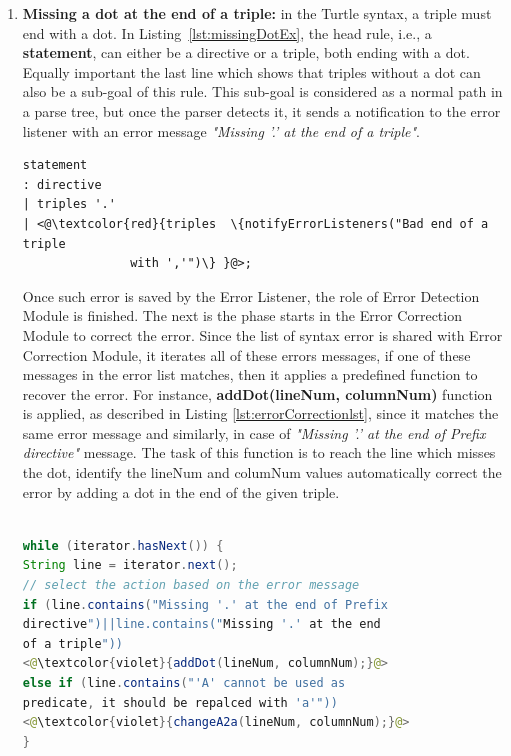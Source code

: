 \begin{enumerate}
    \item \textbf{Missing a dot at the end of a triple:} in the Turtle syntax, a triple must end with a dot. 
    In Listing~\ref{lst:missingDotEx}, the head rule, i.e., a \textbf{statement}, can either be a directive or a triple, both ending with a dot. 
    Equally important the last line which shows that triples without a dot can also be a sub-goal of this rule. 
    This sub-goal is considered as a normal path in a parse tree, but once the parser detects it, it sends a notification to the error listener with an error message \emph{"Missing ’.’ at the end of a triple"}.  
    
    
\begin{lstlisting}[label=lst:missingDotEx,  caption={The grammar rule for Detection of a syntax error for a missing dot at the end of a triple.}] 
statement
: directive
| triples '.'
| <@\textcolor{red}{triples  \{notifyErrorListeners("Bad end of a triple
               with ','")\} }@>;
\end{lstlisting}
Once such error is saved by the Error Listener, the role of Error Detection Module is finished. 
The next is the phase starts in the Error Correction Module to correct the error. 
Since the list of syntax error is shared with Error Correction Module, it iterates all of these errors messages, if one of these messages in the error list matches, then it applies a predefined function to recover the error.  
For instance, \textbf{addDot(lineNum, columnNum)} function is applied, as described in Listing \ref{lst:errorCorrectionlst}, since it matches the same error message and similarly, in case of \emph{"Missing  ’.’ at the end of Prefix directive"} message. 
The task of this function is to reach the line which misses the dot, identify the lineNum and columNum values automatically correct the error by adding a dot in the end of the given triple. 

\begin{lstlisting}[language=java, label=lst:errorCorrectionlst,  caption={Java-based handling for error recovery based on the error message in Error Correction Module.}] 

while (iterator.hasNext()) {
String line = iterator.next();
// select the action based on the error message
if (line.contains("Missing '.' at the end of Prefix
directive")||line.contains("Missing '.' at the end 
of a triple"))
<@\textcolor{violet}{addDot(lineNum, columnNum);}@>
else if (line.contains("'A' cannot be used as
predicate, it should be repalced with 'a'"))
<@\textcolor{violet}{changeA2a(lineNum, columnNum);}@>
}
\end{lstlisting}


\end{enumerate}
